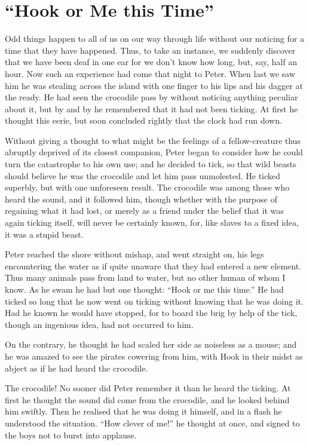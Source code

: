 
\chapter{“Hook or Me this Time”}

Odd things happen to all of us on our way through life
without our noticing for a time that they have happened.
Thus, to take an instance,
we suddenly discover that we have been deaf in one ear for we don’t know how long, but, say, half an hour.
Now such an experience had come that night to Peter.
When last we saw him he was stealing across the island
with one finger to his lips and his dagger at the ready.
He had seen the crocodile pass by without noticing anything peculiar about it,
but by and by he remembered that it had not been ticking.
At first he thought this eerie,
but soon concluded rightly that the clock had run down.

Without giving a thought to what might be the feelings
of a fellow-creature thus abruptly deprived of its closest companion,
Peter began to consider how he could turn the catastrophe to his own use;
and he decided to tick, so that wild beasts should believe he was the crocodile and let him pass unmolested.
He ticked superbly, but with one unforeseen result.
The crocodile was among those who heard the sound, and it followed him,
though whether with the purpose of regaining what it had lost,
or merely as a friend under the belief that it was again ticking itself,
will never be certainly known, for, like slaves to a fixed idea, it was a stupid beast.

Peter reached the shore without mishap, and went straight on,
his legs encountering the water as if quite unaware that they had entered a new element.
Thus many animals pass from land to water, but no other human of whom I know.
As he swam he had but one thought:
“Hook or me this time.”
He had ticked so long that he now went on ticking without knowing that he was doing it.
Had he known he would have stopped,
for to board the brig by help of the tick, though an ingenious idea, had not occurred to him.

On the contrary, he thought he had scaled her side as noiseless as a mouse;
and he was amazed to see the pirates cowering from him,
with Hook in their midst as abject as if he had heard the crocodile.

The crocodile!
No sooner did Peter remember it than he heard the ticking.
At first he thought the sound did come from the crocodile, and he looked behind him swiftly.
Then he realised that he was doing it himself, and in a flash he understood the situation.
“How clever of me!\@” he thought at once, and signed to the boys not to burst into applause.

